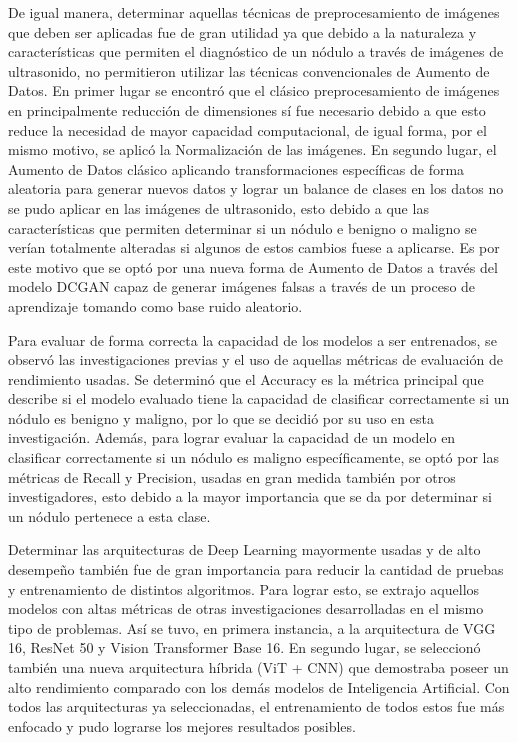 De igual manera, determinar aquellas técnicas de preprocesamiento de imágenes que deben ser aplicadas fue de gran utilidad ya que debido a la naturaleza y características que permiten el diagnóstico de un nódulo a través de imágenes de ultrasonido, no permitieron utilizar las técnicas convencionales de Aumento de Datos. En primer lugar se encontró que el clásico preprocesamiento de imágenes en principalmente reducción de dimensiones sí fue necesario debido a que esto reduce la necesidad de mayor capacidad computacional, de igual forma, por el mismo motivo, se aplicó la Normalización de las imágenes. En segundo lugar, el Aumento de Datos clásico aplicando transformaciones específicas de forma aleatoria para generar nuevos datos y lograr un balance de clases en los datos no se pudo aplicar en las imágenes de ultrasonido, esto debido a que las características que permiten determinar si un nódulo e benigno o maligno se verían totalmente alteradas si algunos de estos cambios fuese a aplicarse. Es por este motivo que se optó por una nueva forma de Aumento de Datos a través del modelo DCGAN capaz de generar imágenes falsas a través de un proceso de aprendizaje tomando como base ruido aleatorio.

Para evaluar de forma correcta la capacidad de los modelos a ser entrenados, se observó las investigaciones previas y el uso de aquellas métricas de evaluación de rendimiento usadas. Se determinó que el Accuracy es la métrica principal que describe si el modelo evaluado tiene la capacidad de clasificar correctamente si un nódulo es benigno y maligno, por lo que se decidió por su uso en esta investigación. Además, para lograr evaluar la capacidad de un modelo en clasificar correctamente si un nódulo es maligno específicamente, se optó por las métricas de Recall y Precision, usadas en gran medida también por otros investigadores, esto debido a la mayor importancia que se da por determinar si un nódulo pertenece a esta clase.

Determinar las arquitecturas de Deep Learning mayormente usadas y de alto desempeño también fue de gran importancia para reducir la cantidad de pruebas y entrenamiento de distintos algoritmos. Para lograr esto, se extrajo aquellos modelos con altas métricas de otras investigaciones desarrolladas en el mismo tipo de problemas. Así se tuvo, en primera instancia, a la arquitectura de VGG 16, ResNet 50 y Vision Transformer Base 16. En segundo lugar, se seleccionó también una nueva arquitectura híbrida (ViT + CNN) que demostraba poseer un alto rendimiento comparado con los demás modelos de Inteligencia Artificial. Con todos las arquitecturas ya seleccionadas, el entrenamiento de todos estos fue más enfocado y pudo lograrse los mejores resultados posibles.

